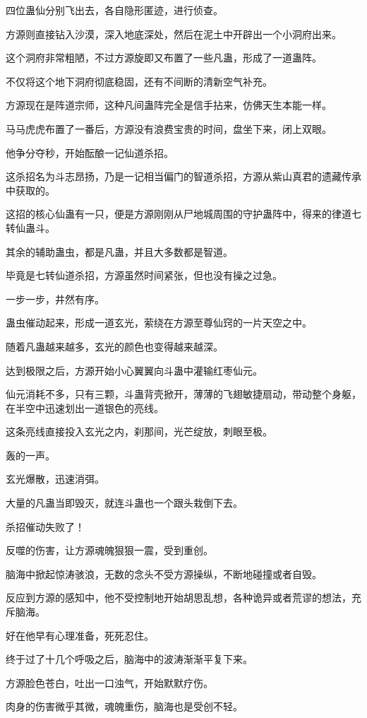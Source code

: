 \begin{this_body}
四位蛊仙分别飞出去，各自隐形匿迹，进行侦查。

方源则直接钻入沙漠，深入地底深处，然后在泥土中开辟出一个小洞府出来。

这个洞府非常粗陋，不过方源旋即又布置了一些凡蛊，形成了一道蛊阵。

不仅将这个地下洞府彻底稳固，还有不间断的清新空气补充。

方源现在是阵道宗师，这种凡间蛊阵完全是信手拈来，仿佛天生本能一样。

马马虎虎布置了一番后，方源没有浪费宝贵的时间，盘坐下来，闭上双眼。

他争分夺秒，开始酝酿一记仙道杀招。

这杀招名为斗志昂扬，乃是一记相当偏门的智道杀招，方源从紫山真君的遗藏传承中获取的。

这招的核心仙蛊有一只，便是方源刚刚从尸地城周围的守护蛊阵中，得来的律道七转仙蛊斗。

其余的辅助蛊虫，都是凡蛊，并且大多数都是智道。

毕竟是七转仙道杀招，方源虽然时间紧张，但也没有操之过急。

一步一步，井然有序。

蛊虫催动起来，形成一道玄光，萦绕在方源至尊仙窍的一片天空之中。

随着凡蛊越来越多，玄光的颜色也变得越来越深。

达到极限之后，方源开始小心翼翼向斗蛊中灌输红枣仙元。

仙元消耗不多，只有三颗，斗蛊背壳掀开，薄薄的飞翅敏捷扇动，带动整个身躯，在半空中迅速划出一道银色的亮线。

这条亮线直接投入玄光之内，刹那间，光芒绽放，刺眼至极。

轰的一声。

玄光爆散，迅速消弭。

大量的凡蛊当即毁灭，就连斗蛊也一个跟头栽倒下去。

杀招催动失败了！

反噬的伤害，让方源魂魄狠狠一震，受到重创。

脑海中掀起惊涛骇浪，无数的念头不受方源操纵，不断地碰撞或者自毁。

反应到方源的感知中，他不受控制地开始胡思乱想，各种诡异或者荒谬的想法，充斥脑海。

好在他早有心理准备，死死忍住。

终于过了十几个呼吸之后，脑海中的波涛渐渐平复下来。

方源脸色苍白，吐出一口浊气，开始默默疗伤。

肉身的伤害微乎其微，魂魄重伤，脑海也是受创不轻。


\end{this_body}
